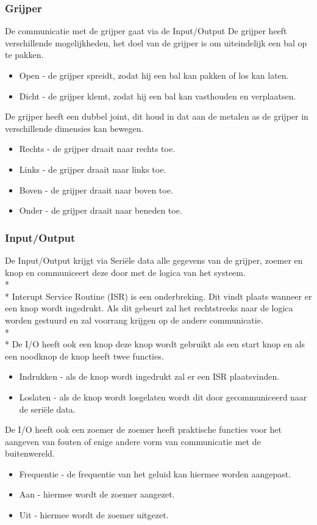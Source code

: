 \documentclass[12pt]{article} %
\begin{document}
\subsubsection{Grijper}
De communicatie met de grijper gaat via de Input/Output
De grijper heeft verschillende mogelijkheden, het doel van de grijper is om uiteindelijk een bal op te pakken.
\begin{itemize}
\item Open - de grijper spreidt, zodat hij een bal kan pakken of los kan laten.
\item Dicht - de grijper klemt, zodat hij een bal kan vasthouden en verplaatsen.
\end{itemize} 
De grijper heeft een dubbel joint, dit houd in dat aan de metalen as de grijper in verschillende dimensies kan bewegen.
\begin{itemize}
\item Rechts - de grijper draait naar rechts toe.
\item Links - de grijper draait naar links toe.
\item Boven - de grijper draait naar boven toe.
\item Onder - de grijper draait naar beneden toe.
\end{itemize}

\subsubsection{Input/Output}
De Input/Output krijgt via Seriële data alle gegevens van de grijper, zoemer en knop en communiceert deze door met de logica van het systeem. \\* \\*
Interupt Service Routine (ISR) is een onderbreking. Dit vindt plaats wanneer er een knop wordt ingedrukt. Als dit gebeurt zal het rechtstreeks naar de logica worden gestuurd en zal voorrang krijgen op de andere communicatie. \\* \\*
De I/O heeft ook een knop deze knop wordt gebruikt als een start knop en als een noodknop de knop heeft twee functies.
\begin{itemize}
\item Indrukken - als de knop wordt ingedrukt zal er een ISR plaatsvinden.
\item Loslaten - als de knop wordt losgelaten wordt dit door gecommuniceerd naar de seriële data.
\end{itemize}
De I/O heeft ook een zoemer de zoemer heeft praktische functies voor het aangeven van fouten of enige andere vorm van communicatie met de buitenwereld.
\begin{itemize}
\item Frequentie - de frequentie van het geluid kan hiermee worden aangepast.
\item Aan - hiermee wordt de zoemer aangezet.
\item Uit - hiermee wordt de zoemer uitgezet.
\end{itemize}
\end{document}
